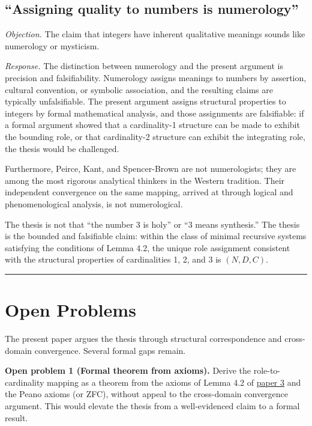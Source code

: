 \documentclass[12pt]{article}
\begin{document}
\subsection{``Assigning quality to numbers is numerology''}\label{assigning-quality-to-numbers-is-numerology}

\emph{Objection.} The claim that integers have inherent qualitative
meanings sounds like numerology or mysticism.

\emph{Response.} The distinction between numerology and the present
argument is precision and falsifiability. Numerology assigns meanings to
numbers by assertion, cultural convention, or symbolic association, and
the resulting claims are typically unfalsifiable. The present argument
assigns structural properties to integers by formal mathematical
analysis, and those assignments are falsifiable: if a formal argument
showed that a cardinality-1 structure can be made to exhibit the
bounding role, or that cardinality-2 structure can exhibit the
integrating role, the thesis would be challenged.

Furthermore, Peirce, Kant, and Spencer-Brown are not numerologists; they
are among the most rigorous analytical thinkers in the Western
tradition. Their independent convergence on the same mapping, arrived at
through logical and phenomenological analysis, is not numerological.

The thesis is not that ``the number 3 is holy'' or ``3 means
synthesis.'' The thesis is the bounded and falsifiable claim: within the
class of minimal recursive systems satisfying the conditions of Lemma
4.2, the unique role assignment consistent with the structural
properties of cardinalities 1, 2, and 3 is \((N, D, C)\).

\begin{center}\rule{0.5\linewidth}{0.5pt}\end{center}

\section{Open Problems}\label{open-problems}

The present paper argues the thesis through structural correspondence
and cross-domain convergence. Several formal gaps remain.

\textbf{Open problem 1 (Formal theorem from axioms).} Derive the
role-to-cardinality mapping as a theorem from the axioms of Lemma 4.2 of
\href{https://github.com/baardev/truevalue/blob/main/docnav/Research/papers/3_minimal-recursive-triadic-framework/3_minimal-recursive-triadic-framework.pdf}{paper
3} and the Peano axioms (or ZFC), without appeal to the cross-domain
convergence argument. This would elevate the thesis from a
well-evidenced claim to a formal result.
\end{document}
